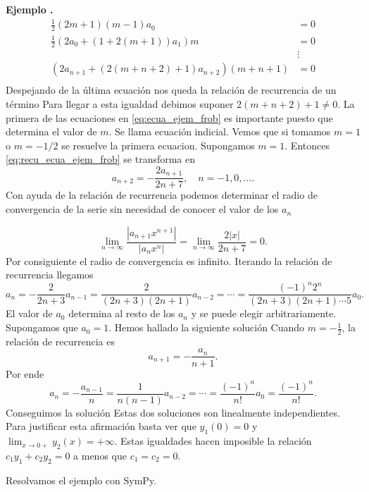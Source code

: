 \documentclass{article}
\newcounter{ejem_cont}
\newenvironment{ejemplo}[1]{\refstepcounter{ejem_cont}\vspace{1ex}\noindent\textbf{Ejemplo \arabic{ejem_cont}.} #1}{}
\begin{document}
\begin{ejemplo}
\begin{equation}\label{eq:ecua_ejem_frob}
    \begin{split}
      \frac12\left(2m+1\right)(m-1) a_0&=0\\
       \frac{1}{2}  \left(   2 a_{0} + (1+2(m+1)) a_{1}\right)m&=0\\
                                      &\vdots\\
     \left(   2a_{n+1}+ (2(m+n+2)+1)a_{n+2}  \right)(m+n+1) &=0\\
    \end{split}
\end{equation}
Despejando de la última ecuación nos queda la relación de recurrencia de un término
Para llegar a esta igualdad debimos suponer $2(m+n+2)+1\neq 0$. 
La primera de las ecuaciones en \eqref{eq:ecua_ejem_frob} es importante puesto que determina el valor de $m$. Se llama ecuación indicial. Vemos que si tomamos $m=1$ o $m=-1/2$ se resuelve la primera ecuacion. Supongamos $m=1$. Entonces \eqref{eq:recu_ecua_ejem_frob} se transforma en
\[
a_{n+2}=-\frac{2a_{n+1}}{2n+7},\quad n=-1,0,\ldots.
\]
Con ayuda de la relación de recurrencia podemos determinar el radio de convergencia de la serie sin necesidad de conocer el valor de los $a_n$

\[\lim_{n\to\infty}\frac{|a_{n+1}x^{n+1}|}{|a_{n}x^{n}|}=
\lim_{n\to\infty}\frac{2|x|}{2n+7}=0.\]
Por consiguiente el radio de convergencia es infinito.  Iterando la relación de recurrencia llegamos 
\[a_{n}=-\frac{2}{2n+3}a_{n-1}=\frac{2}{(2n+3)(2n+1)}a_{n-2}=\cdots=
\frac{(-1)^n2^{n}}{(2n+3)(2n+1)\cdots 5}a_0.\]
El valor de $a_0$ determina al resto de los $a_n$ y se puede elegir arbitrariamente. Supongamos que $a_0=1$. Hemos hallado la siguiente solución  
Cuando $m=-\frac12$, la relación de recurrencia es
\[a_{n+1}=-\frac{a_{n}}{n+1}.\]
Por ende
\[a_n=-\frac{a_{n-1}}{n}=\frac{1}{n(n-1)}a_{n-2}=\cdots=\frac{(-1)^n}{n!}a_{0}=\frac{(-1)^n}{n!}.\]
Conseguimos la solución
Estas dos soluciones son linealmente independientes. Para justificar esta afirmación basta ver que $y_1(0)=0$ y $\lim_{x\to 0+}y_2(x)=+\infty$. Estas igualdades hacen imposible la relación $c_1y_1+c_2y_2=0$ a menos que $c_1=c_2=0$.

Resolvamos el ejemplo con SymPy. 


\end{ejemplo}
\end{document}
